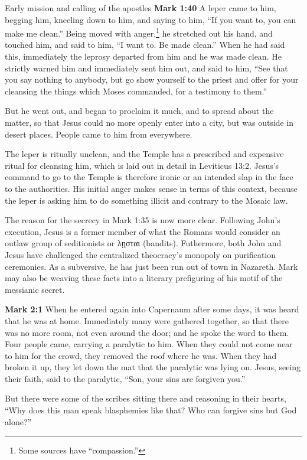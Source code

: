 \documentclass[10pt,twoside]{article} %
\newcommand{\quotesize}{\normalsize{}}
\newcommand{\comm}[1]{\begingroup \color{black!50} #1\endgroup}
\newenvironment{quotetext}{\begingroup\quotesize}{\endgroup}
\newcommand{\bible}[2]{\begin{quotetext}\textbf{#1} #2\end{quotetext}}
\newcommand{\gospelmark}[2]{\bible{Mark #1}{#2}}
\begin{document}
\begin{section}{Early mission and calling of the apostles}
\gospelmark{1:40}{A leper came to him, begging him, kneeling down to him, and saying to him, ``If you want to, you can make me clean.''
  Being moved with anger,\footnote{Some sources have ``compassion.''} he stretched out his hand, and touched him, and said to him, ``I want to. Be made clean.''   When he had said this, immediately the leprosy departed from him and he was made clean.   He strictly warned him and immediately sent him out,   and said to him, ``See that you say nothing to anybody, but go show yourself to the priest and offer for your cleansing the things which Moses commanded, for a testimony to them.''

  But he went out, and began to proclaim it much, and to spread about the matter, so that Jesus could no more openly enter into a city, but was outside in desert places. People came to him from everywhere. }

\comm{
The leper is ritually unclean, and the Temple has a prescribed
and expensive ritual for cleansing him, which is laid out in detail in Leviticus 13:2. Jesus's command to go to the Temple is therefore ironic
or an intended slap in the face to the authorities. His initial anger makes sense in terms of this context, because the leper is asking him
to do something illicit and contrary to the Mosaic law.

The reason for the secrecy in Mark 1:35 is now more clear. Following John's execution, Jesus is a former member of
what the Romans would consider an outlaw group of seditionists or λῃσται (bandits).  Futhermore, both John and Jesus have challenged the
centralized theocracy's monopoly on purification ceremonies. As a subversive, he has
just been run out of town in Nazareth. Mark may also be weaving these facts into a
literary prefiguring of his motif of the messianic secret.}

\gospelmark{2:1}{When he entered again into Capernaum after some days, it was heard that he was at home.   Immediately many were gathered together, so that there was no more room, not even around the door; and he spoke the word to them.   Four people came, carrying a paralytic to him.   When they could not come near to him for the crowd, they removed the roof where he was. When they had broken it up, they let down the mat that the paralytic was lying on.   Jesus, seeing their faith, said to the paralytic, ``Son, your sins are forgiven you.''

  But there were some of the scribes sitting there and reasoning in their hearts,   ``Why does this man speak blasphemies like that? Who can forgive sins but God alone?''

}
\end{section}
\end{document}
